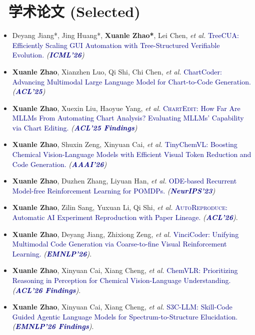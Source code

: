 \documentclass{resume}
\newcommand{\conf}[1]{\textit{(\textcolor{Navy}{\textbf{#1}})}}
\begin{document}

\section{\faBook\ 学术论文 (Selected)}
\begin{itemize}
\item Deyang Jiang*, Jing Huang*, \textbf{Xuanle Zhao*}, Lei Chen, \textit{et al.} \textcolor{Navy}{TreeCUA: Efficiently Scaling GUI Automation with Tree-Structured Verifiable Evolution.} \conf{ICML'26}
\item \textbf{Xuanle Zhao}, Xianzhen Luo, Qi Shi, Chi Chen, \textit{et al.} \textcolor{Navy}{ChartCoder: Advancing Multimodal Large Language Model for Chart-to-Code Generation.} \conf{ACL'25}
\item \textbf{Xuanle Zhao}, Xuexin Liu, Haoyue Yang, \textit{et al.} \textcolor{Navy}{\textsc{ChartEdit}: How Far Are MLLMs From Automating Chart Analysis? Evaluating MLLMs' Capability via Chart Editing.} \conf{ACL'25 Findings}
\item \textbf{Xuanle Zhao}, Shuxin Zeng, Xinyuan Cai, \textit{et al.} \textcolor{Navy}{TinyChemVL: Boosting Chemical Vision-Language Models with Efficient Visual Token Reduction and Code Generation.} \conf{AAAI'26}
\item \textbf{Xuanle Zhao}, Duzhen Zhang, Liyuan Han, \textit{et al.} \textcolor{Navy}{ODE-based Recurrent Model-free Reinforcement Learning for POMDPs.} \conf{NeurIPS'23}
\item \textbf{Xuanle Zhao}, Zilin Sang, Yuxuan Li, Qi Shi, \textit{et al.} \textcolor{Navy}{\textsc{AutoReproduce}: Automatic AI Experiment Reproduction with Paper Lineage.} \conf{ACL'26}.
\item \textbf{Xuanle Zhao}, Deyang Jiang, Zhixiong Zeng, \textit{et al.} \textcolor{Navy}{VinciCoder: Unifying Multimodal Code Generation via Coarse-to-fine Visual Reinforcement Learning.} \conf{EMNLP'26}.
\item \textbf{Xuanle Zhao}, Xinyuan Cai, Xiang Cheng, \textit{et al.} \textcolor{Navy}{ChemVLR: Prioritizing Reasoning in Perception for Chemical Vision-Language Understanding.} \conf{ACL'26 Findings}.
\item \textbf{Xuanle Zhao}, Xinyuan Cai, Xiang Cheng, \textit{et al.} \textcolor{Navy}{S3C-LLM: Skill-Code Guided Agentic Language Models for Spectrum-to-Structure Elucidation.} \conf{EMNLP'26 Findings}.
\end{itemize}
\end{document}
